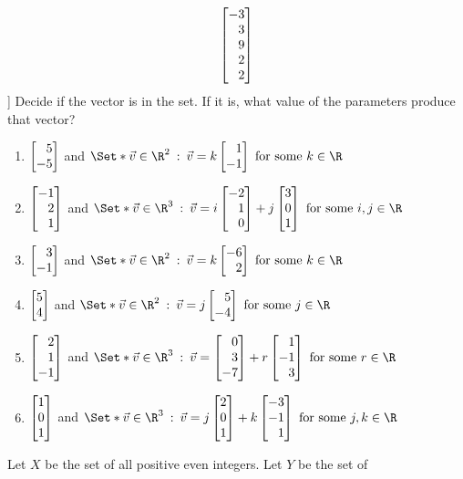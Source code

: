 \begin{exercises}
\begin{problist}
\[			\mat{-3\\3\\9\\2\\2}
		\]
		\prob[\hefferon[2.21,2.22]]
			Decide if the vector is in the set. If it is, what value of the
			parameters produce that vector?
			\begin{enumerate}
				\item
					$\mat{5\\-5}$ and
					$\Set*{\vec v\in\R^2 \given
					\vec v=k\mat{1\\-1}\text{ for some }k\in\R}$
				\item $\mat{-1 \\ 2 \\ 1}$ and
					$\Set*{\vec v\in\R^3\given
						\vec v=i\mat{-2 \\ 1 \\ 0} +j\mat{3 \\ 0 \\ 1}
						\text{ for some }i,j\in\R
					}$
					\item
						$\mat{3 \\ -1}$ and $\Set*{ \vec v\in\R^2\given
							\vec v=k\mat{-6 \\ 2}\text{ for some } k\in\R
						}$
					\item
						$\mat{5 \\ 4}$ and
						$\Set*{\vec v\in\R^2\given
							\vec v=j\mat{5 \\ -4}\text{ for some }j\in\R
						}$
					\item $\mat{2 \\ 1 \\ -1}$ and
						$\Set*{\vec v\in\R^3
							\given \vec v= \mat{0 \\ 3 \\ -7} +r\mat{1 \\ -1 \\ 3}
							\text{ for some }r\in\R
						}$
					\item $\mat{1 \\ 0 \\ 1}$ and
						$\Set*{\vec v\in\R^3\given
							\vec v= j\mat{2 \\ 0 \\ 1} +k\mat{-3 \\ -1 \\ 1}
							\text{ for some }j,k\in\R
						}$
			\end{enumerate}
		\prob
			Let $X$ be the set of all positive even integers. Let $Y$ be the set of

\end{problist}
\end{exercises}
